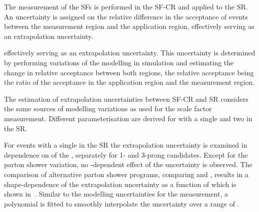 

%   


The measurement of the SFs is performed in the SF-CR and applied to the \hadhad
SR. An uncertainty is assigned on the relative difference in the acceptance of
\ttbarFakes events between the measurement region and the application region,
effectively serving as an extrapolation uncertainty.

effectively serving as an extrapolation uncertainty. This uncertainty is
determined by performing variations of the \ttbar modelling in simulation and
estimating the change in relative acceptance between both regions, the relative
acceptance being the ratio of the acceptance in the application region and the
measurement region.

The estimation of extrapolation uncertainties between SF-CR and \hadhad SR
considers the same sources of \ttbar modelling variations as used for the scale
factor measurement. Different parameterisation are derived for \ttbar with a
single \faketauhadvis and two \faketauhadvis in the \hadhad SR.

For \ttbar events with a single \faketauhadvis in the \hadhad SR the
extrapolation uncertainty is examined in dependence on \pT of the
\faketauhadvis, separately for 1- and 3-prong candidates. Except for the parton
shower variation, no \tauhadvis \pT-dependent effect of the uncertainty is
observed.  The comparison of alternative parton shower programs, comparing
\PYTHIA[8] and \HERWIG[7], results in a shape-dependence of the extrapolation
uncertainty as a function of \tauhadvis \pT which is shown
in~.  Similar to the modelling uncertainties
for the measurement, a polynomial is fitted to smoothly interpolate the
uncertainty over a range of \tauhadvis \pT.

